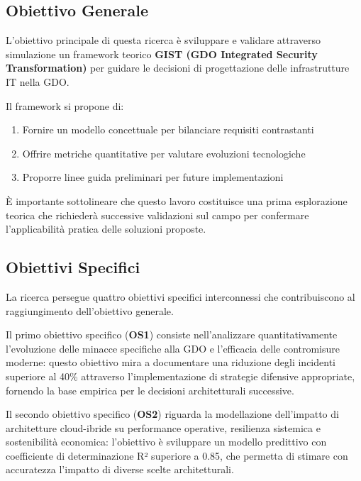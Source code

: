 \subsection{\texorpdfstring{\textbf{Obiettivo
Generale}}{1.3.1 Obiettivo Generale}}\label{obiettivo-generale}

L'obiettivo principale di questa ricerca è sviluppare e validare attraverso 
simulazione un framework teorico \textbf{GIST (GDO Integrated Security Transformation)} per guidare le decisioni di 
progettazione delle infrastrutture IT nella GDO. 

Il framework si propone di:
\begin{enumerate}
    \item 
    Fornire un modello concettuale per bilanciare requisiti contrastanti
    \item 
    Offrire metriche quantitative per valutare evoluzioni tecnologiche
    \item 
    Proporre linee guida preliminari per future implementazioni
\end{enumerate}

È importante sottolineare che questo lavoro costituisce una prima 
esplorazione teorica che richiederà successive validazioni sul campo 
per confermare l'applicabilità pratica delle soluzioni proposte.

\subsection{\texorpdfstring{\textbf{Obiettivi
Specifici}}{1.3.2 Obiettivi Specifici}}\label{obiettivi-specifici}

La ricerca persegue quattro obiettivi specifici interconnessi che
contribuiscono al raggiungimento dell'obiettivo generale.

Il primo obiettivo specifico (\textbf{OS1}) consiste nell'analizzare quantitativamente l'evoluzione delle minacce specifiche alla GDO e l'efficacia delle contromisure moderne: questo obiettivo mira a documentare una riduzione degli incidenti superiore al 40\% attraverso l'implementazione di strategie difensive appropriate, fornendo la base empirica per le decisioni architetturali successive.

Il secondo obiettivo specifico (\textbf{OS2}) riguarda la modellazione dell'impatto di architetture cloud-ibride su performance operative, resilienza sistemica e sostenibilità economica: l'obiettivo è sviluppare un modello predittivo con coefficiente di determinazione R² superiore a 0.85, che permetta di stimare con accuratezza l'impatto di diverse scelte architetturali.

